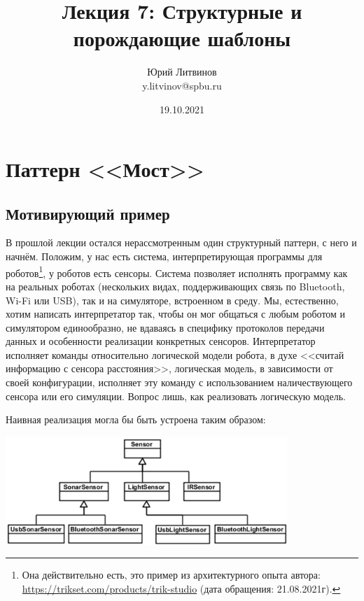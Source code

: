 \documentclass[a5paper]{article}
\title{Лекция 7: Структурные и порождающие шаблоны}
\author{Юрий Литвинов\\\small{y.litvinov@spbu.ru}}
\date{19.10.2021}
\begin{document}
\maketitle
\thispagestyle{empty}

\section{Паттерн <<Мост>>}

\subsection{Мотивирующий пример}

В прошлой лекции остался нерассмотренным один структурный паттерн, с него и начнём. Положим, у нас есть система, интерпретирующая программы для роботов\footnote{Она действительно есть, это пример из архитектурного опыта автора: \url{https://trikset.com/products/trik-studio} (дата обращения: 21.08.2021г).}, у роботов есть сенсоры. Система позволяет исполнять программу как на реальных роботах (нескольких видах, поддерживающих связь по Bluetooth, Wi-Fi или USB), так и на симуляторе, встроенном в среду. Мы, естественно, хотим написать интерпретатор так, чтобы он мог общаться с любым роботом и симулятором единообразно, не вдаваясь в специфику протоколов передачи данных и особенности реализации конкретных сенсоров. Интерпретатор исполняет команды относительно логической модели робота, в духе <<считай информацию с сенсора расстояния>>, логическая модель, в зависимости от своей конфигурации, исполняет эту команду с использованием наличествующего сенсора или его симуляции. Вопрос лишь, как реализовать логическую модель.

Наивная реализация могла бы быть устроена таким образом:

\begin{center}
    \includegraphics[width=0.8\textwidth]{noBridge.png}
\end{center}
\end{document}
